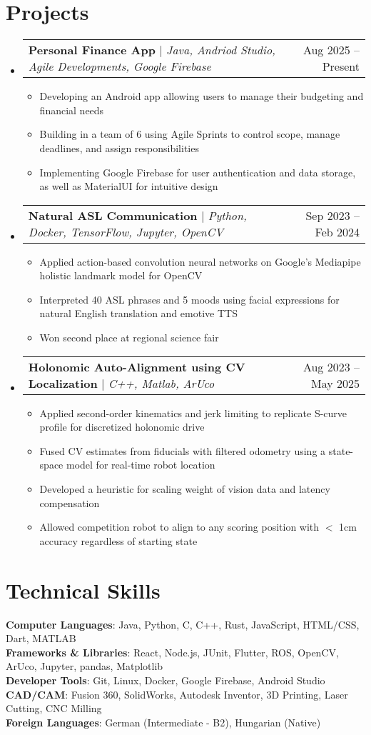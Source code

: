 \documentclass[letterpaper,11pt]{article}
\makeatletter
\newcommand{\resumeItem}[1]{
  \item\small{
    {#1 \vspace{-2pt}}
  }
}
\newcommand{\resumeProjectHeading}[2]{
    \item
    \begin{tabular*}{0.97\textwidth}{l@{\extracolsep{\fill}}r}
      \small#1 & #2 \\
    \end{tabular*}\vspace{-7pt}
}
\newcommand{\resumeSubHeadingListStart}{\begin{itemize}[leftmargin=0.15in, label={}]}
\newcommand{\resumeSubHeadingListEnd}{\end{itemize}}
\newcommand{\resumeItemListStart}{\begin{itemize}}
\newcommand{\resumeItemListEnd}{\end{itemize}\vspace{-5pt}}
\makeatother
\begin{document}
\section{Projects}
    \resumeSubHeadingListStart
      \resumeProjectHeading
          {\textbf{Personal Finance App} $|$ \emph{Java, Andriod Studio, Agile Developments, Google Firebase}}{Aug 2025 -- Present}
          \resumeItemListStart
            \resumeItem{Developing an Android app allowing users to manage their budgeting and financial needs}
            \resumeItem{Building in a team of 6 using Agile Sprints to control scope, manage deadlines, and assign responsibilities}
            \resumeItem{Implementing Google Firebase for user authentication and data storage, as well as MaterialUI for intuitive design}
          \resumeItemListEnd
        \resumeProjectHeading
          {\textbf{Natural ASL Communication} $|$ \emph{Python, Docker, TensorFlow, Jupyter, OpenCV}}{Sep 2023 -- Feb 2024}
          \resumeItemListStart
            \resumeItem{Applied action-based convolution neural networks on Google's Mediapipe holistic landmark model for OpenCV}
            \resumeItem{Interpreted 40 ASL phrases and 5 moods using facial expressions for natural English translation and emotive TTS}
            \resumeItem{Won second place at regional science fair}
          \resumeItemListEnd
      \resumeProjectHeading
          {\textbf{Holonomic Auto-Alignment using CV Localization} $|$ \emph{C++, Matlab, ArUco}}{Aug 2023 -- May 2025}
          \resumeItemListStart
            \resumeItem{Applied second-order kinematics and jerk limiting to replicate S-curve profile for discretized holonomic drive}
            \resumeItem{Fused CV estimates from fiducials with filtered odometry using a state-space model for real-time robot location}
            \resumeItem{Developed a heuristic for scaling weight of vision data and latency compensation}
            \resumeItem{Allowed competition robot to align to any scoring position with $<$ 1cm accuracy regardless of starting state}
          \resumeItemListEnd
    \resumeSubHeadingListEnd



%
\section{Technical Skills}
 \begin{itemize}[leftmargin=0.15in, label={}]
    \small{\item{
     \textbf{Computer Languages}{: Java, Python, C, C++, Rust, JavaScript, HTML/CSS, Dart, MATLAB} \\
     \textbf{Frameworks \& Libraries}{: React, Node.js, JUnit, Flutter, ROS, OpenCV, ArUco, Jupyter, pandas, Matplotlib} \\
     \textbf{Developer Tools}{: Git, Linux, Docker, Google Firebase, Android Studio} \\
     \textbf{CAD/CAM}{: Fusion 360, SolidWorks, Autodesk Inventor, 3D Printing, Laser Cutting, CNC Milling} \\
     \textbf{Foreign Languages}{: German (Intermediate - B2), Hungarian (Native)}
    }}
 \end{itemize}


\end{document}
